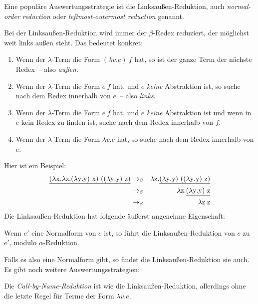 Eine populäre Auswertungsstrategie ist die Linksaußen-Reduktion, auch
\textit{normal-order reduction} oder
\textit{leftmost-outermost reduction} genannt.
%
\begin{definition}
  Bei der Linksaußen-Reduktion wird immer der $\beta$-Redex reduziert,
  der möglichst weit links außen steht.  Das bedeutet konkret:
  \begin{enumerate}
  \item Wenn der $\lambda$-Term die Form $(\lambda v.e)~f$ hat, so
    ist der ganze Term der nächste Redex~-- also \emph{außen}.
  \item Wenn der $\lambda$-Term die Form $e~f$ hat, und $e$
    \emph{keine} Abstraktion ist, so suche nach dem Redex innerhalb
    von $e$~-- also \emph{links}.
  \item Wenn der $\lambda$-Term die Form $e~f$ hat, und $e$
    \emph{keine} Abstraktion ist und wenn in $e$ kein Redex zu finden
    ist, suche nach dem Redex innerhalb von $f$.
  \item Wenn der $\lambda$-Term die Form $\lambda v.e$ hat, so suche
    nach dem Redex innerhalb von $e$.
  \end{enumerate}
\end{definition}
%
Hier ist ein Beispiel:
%
\begin{eqnarray*}
  \underline{(\lambda \mathrm x.\lambda \mathrm z.(\lambda \mathrm y.\mathrm y)~\mathrm x)~((\lambda \mathrm y.\mathrm y)~\mathrm z)}
  &  \rightarrow_\beta &
                         \lambda \mathrm z.\underline{(\lambda \mathrm y.\mathrm y)~((\lambda \mathrm y.\mathrm y)~\mathrm z)}\\
  &  \rightarrow_\beta & \lambda \mathrm z.\underline{(\lambda \mathrm y.\mathrm y)~\mathrm z}\\
  &  \rightarrow_\beta & \lambda \mathrm z.\mathrm z
\end{eqnarray*}
%
Die Linksaußen-Reduktion hat folgende äußerst angenehme Eigenschaft:
%
\begin{satz}
  Wenn $e'$ eine Normalform von $e$ ist, so führt die
  Linksaußen-Reduktion von $e$ zu $e'$, modulo $\alpha$-Reduktion.
\end{satz}
%
Falls es also eine Normalform gibt, so findet die Linksaußen-Reduktion
sie auch.
Es gibt noch weitere Auswertungsstrategien:
%
\begin{definition}
  Die \textit{Call-by-Name-Reduktion} ist wie die
  Linksaußen-Reduktion, allerdings ohne die letzte Regel für Terme der
  Form $\lambda v.e$.
\end{definition}
